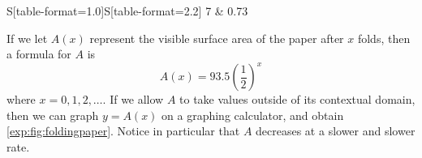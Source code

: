 \begin{pccexample}
\begin{table}[!htb]
\begin{minipage}{.5\textwidth}
\begin{tabular}{S[table-format=1.0]S[table-format=2.2]}
				7                         & 0.73                             \\\lastline
			\end{tabular}
		\end{minipage}%
		\begin{minipage}{.5\textwidth}
			\centering
			\label{exp:fig:foldingpaper}
		\end{minipage}%
	\end{table}
							
	If we let $A(x)$ represent the visible surface area of the paper after $x$ folds, then 
	a formula for $A$ is
	\[
		A(x) = 93.5\left(\frac{1}{2}\right)^x
	\]
	where $x=0,1,2,\ldots$. If we allow $A$ to take values outside of its contextual domain, then 
	we can graph $y=A(x)$ on a graphing calculator, and obtain \cref{exp:fig:foldingpaper}. Notice 
	in particular that $A$ decreases at a slower and slower rate.
\end{pccexample}

